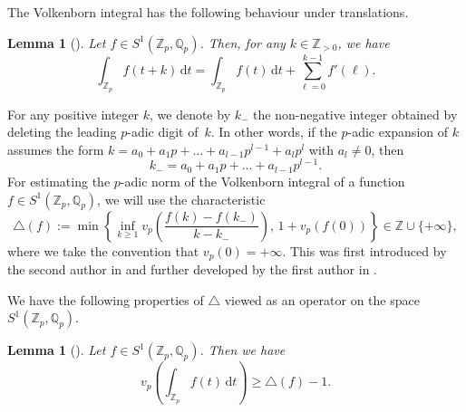 \documentclass[12pt]{article}
\let\ge\geqslant
\renewcommand{\d}{\mathrm{d}}
\newtheorem{lemma}[theorem]{Lemma}
\theoremstyle{remark}
\numberwithin{equation}{section}
\begin{document}
The Volkenborn integral has the following behaviour under translations.

\begin{lemma}[{\cite[Proposition 2, p.~265]{Rob2000}}]
\label{lem_translation_formula}
Let $f \in S^{1}(\mathbb{Z}_p,\mathbb{Q}_p)$. 
Then, for any $k \in \mathbb{Z}_{>0}$, we have
\[ 
\int_{\mathbb{Z}_p} f(t+k)\,\d t = \int_{\mathbb{Z}_p} f(t)\,\d t + \sum_{\ell=0}^{k-1} f'(\ell). 
\]
\end{lemma}

For any positive integer $k$, we denote by $k_{-}$ the non-negative integer obtained by deleting the leading $p$-adic digit of~$k$. 
In other words, if the $p$-adic expansion of $k$ assumes the form
$k=a_0+a_1p+\dots+a_{l-1}p^{l-1}+a_{l}p^{l}$ with $a_l \ne 0$, then 
\[
k_{-} = a_0+a_1p+\dots+a_{l-1}p^{l-1}.
\] 
For estimating the $p$-adic norm of the Volkenborn integral of a function $f \in S^{1}(\mathbb{Z}_p,\mathbb{Q}_p)$, we will use the characteristic
\[
\triangle(f) := \min\left\{\inf_{k \ge 1} v_p\left( \frac{f(k)-f(k_{-})}{k-k_{-}} \right),\, 1+v_p(f(0)) \right\} \in \mathbb{Z} \cup \{+\infty\},
\]
where we take the convention that $v_p(0)=+\infty$.
This was first introduced by the second author in \cite{Spr2020} and further developed by the first author in \cite{Lai2025}. 

We have the following properties of $\triangle$ viewed as an operator on the space $S^{1}(\mathbb{Z}_p,\mathbb{Q}_p)$. 

\begin{lemma}[{\cite[Lemma 2.4]{Lai2025}}]
\label{lem_estimation_of_Volkenborn_integral}
Let $f \in S^{1}(\mathbb{Z}_p,\mathbb{Q}_p)$. Then we have
\begin{equation*}
v_p\left( \int_{\mathbb{Z}_p} f(t)\,\d t \right) \ge \triangle(f) - 1.
\end{equation*}
\end{lemma}
\end{document}
